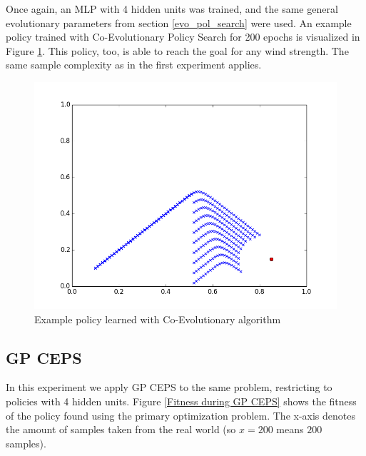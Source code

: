 Once again, an MLP with 4 hidden units was trained, and the same general evolutionary parameters from section \ref{evo_pol_search} were used. An example policy trained with Co-Evolutionary Policy Search for 200 epochs is visualized in Figure \ref{Example policy learned with Co-Evolutionary algorithm}. This policy, too, is able to reach the goal for any wind strength. The same sample complexity as in the first experiment applies.


\begin{figure}[ht]
  \centering
  \includegraphics[scale=0.5]{images/co_evo_result.png}
  \caption{Example policy learned with Co-Evolutionary algorithm}\label{Example policy learned with Co-Evolutionary algorithm}
\end{figure}

\subsection{GP CEPS}

In this experiment we apply GP CEPS to the same problem, restricting to policies with 4 hidden units. Figure \ref{Fitness during GP CEPS} shows the fitness of the policy found using the primary optimization problem. The x-axis denotes the amount of samples taken from the real world (so $x=200$ means $200$ samples). 

